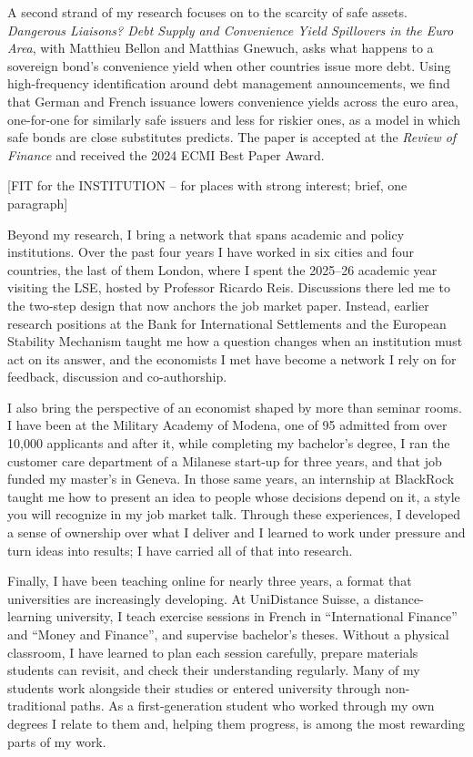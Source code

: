 \documentclass[11pt]{article}
\begin{document}
A second strand of my research focuses on to the scarcity of safe assets. \textit{Dangerous Liaisons? Debt Supply and Convenience Yield Spillovers in the Euro Area}, with Matthieu Bellon and Matthias Gnewuch, asks what happens to a sovereign bond's convenience yield when other countries issue more debt. Using high-frequency identification around debt management announcements, we find that German and French issuance lowers convenience yields across the euro area, one-for-one for similarly safe issuers and less for riskier ones, as a model in which safe bonds are close substitutes predicts. The paper is accepted at the \textit{Review of Finance} and received the 2024 ECMI Best Paper Award.

[FIT for the INSTITUTION -- for places with strong interest; brief, one paragraph]

Beyond my research, I bring a network that spans academic and policy institutions. Over the past four years I have worked in six cities and four countries, the last of them London, where I spent the 2025--26 academic year visiting the LSE, hosted by Professor Ricardo Reis. Discussions there led me to the two-step design that now anchors the job market paper. Instead, earlier research positions at the Bank for International Settlements and the European Stability Mechanism taught me how a question changes when an institution must act on its answer, and the economists I met have become a network I rely on for feedback, discussion and co-authorship.

I also bring the perspective of an economist shaped by more than seminar rooms. I have been at the Military Academy of Modena, one of 95 admitted from over 10,000 applicants and after it, while completing my bachelor's degree, I ran the customer care department of a Milanese start-up for three years, and that job funded my master's in Geneva. In those same years, an internship at BlackRock taught me how to present an idea to people whose decisions depend on it, a style you will recognize in my job market talk. Through these experiences, I developed a sense of ownership over what I deliver and I learned to work under pressure and turn ideas into results; I have carried all of that into research. %

Finally, I have been teaching online for nearly three years, a format that universities are increasingly developing. At UniDistance Suisse, a distance-learning university, I teach exercise sessions in French in ``International Finance'' and ``Money and Finance'', and supervise bachelor's theses. Without a physical classroom, I have learned to plan each session carefully, prepare materials students can revisit, and check their understanding regularly. Many of my students work alongside their studies or entered university through non-traditional paths. As a first-generation student who worked through my own degrees I relate to them and, helping them progress, is among the most rewarding parts of my work. %
\end{document}
